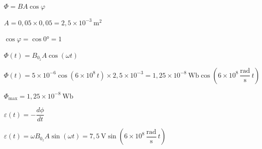 \begin{solapartat}
 $\Phi = BA\cos\varphi$

\smallskip
{} $A = 0,05\times 0,05 = 2,5\times 10^{-3}\ \mathrm{m^2}$

\smallskip
{} $\cos\varphi = \cos 0° = 1$

\smallskip
{} $\Phi(t) = B_{0_z}A\cos(\omega t)$

\smallskip
{} $\Phi(t) = 5\times 10^{-6}\cos\left(6\times 10^{8}\,t\right)\times 2,5\times 10^{-3} = 1,25\times 10^{-8}\ \mathrm{Wb}\cos\left(6\times 10^{8}\,\dfrac{\mathrm{rad}}{\mathrm{s}}\,t\right)$

\smallskip
{} $\Phi_\mathrm{max} = 1,25\times 10^{-8}\ \mathrm{Wb}$
\end{solapartat}

\begin{solapartat}
 $\varepsilon(t) = -\dfrac{d\phi}{dt}$

\smallskip
{} $\varepsilon(t) = \omega B_{0_z}A\sin(\omega t) = 7,5\ \mathrm{V}\sin\left(6\times 10^{8}\,\dfrac{\mathrm{rad}}{\mathrm{s}}\,t\right)$ \quad{}
\end{solapartat}
